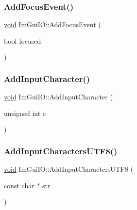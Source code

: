 \subsubsection{\texorpdfstring{Add\+Focus\+Event()}{AddFocusEvent()}}
{\footnotesize\ttfamily \hyperlink{imgui__impl__opengl3__loader_8h_ac668e7cffd9e2e9cfee428b9b2f34fa7}{void} Im\+Gui\+I\+O\+::\+Add\+Focus\+Event (\begin{DoxyParamCaption}\item[{bool}]{focused }\end{DoxyParamCaption})}

\mbox{\label{structImGuiIO_a0ded7ab1043ea14b65e1d81819878ccc}} 
\subsubsection{\texorpdfstring{Add\+Input\+Character()}{AddInputCharacter()}}
{\footnotesize\ttfamily \hyperlink{imgui__impl__opengl3__loader_8h_ac668e7cffd9e2e9cfee428b9b2f34fa7}{void} Im\+Gui\+I\+O\+::\+Add\+Input\+Character (\begin{DoxyParamCaption}\item[{unsigned int}]{c }\end{DoxyParamCaption})}

\mbox{\label{structImGuiIO_abf60d6dc365fab19136059f64680bdcc}} 
\subsubsection{\texorpdfstring{Add\+Input\+Characters\+U\+T\+F8()}{AddInputCharactersUTF8()}}
{\footnotesize\ttfamily \hyperlink{imgui__impl__opengl3__loader_8h_ac668e7cffd9e2e9cfee428b9b2f34fa7}{void} Im\+Gui\+I\+O\+::\+Add\+Input\+Characters\+U\+T\+F8 (\begin{DoxyParamCaption}\item[{const char $\ast$}]{str }\end{DoxyParamCaption})}

\mbox{\label{structImGuiIO_a09ce496becb406f0fbe94dc35915af64}} 
